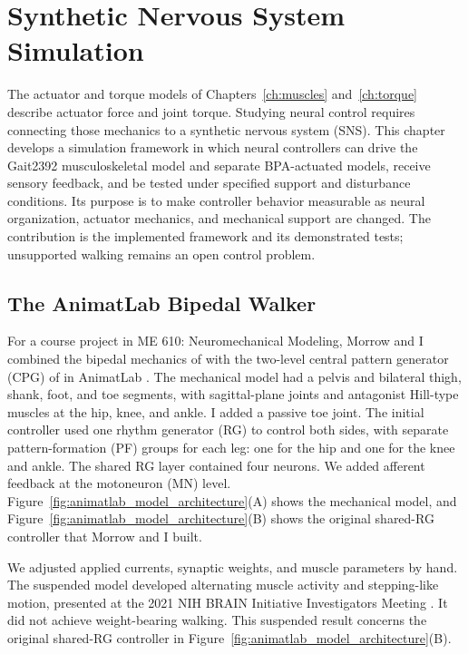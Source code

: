 \chapter{Synthetic Nervous System Simulation}\label{ch:sns}
\graphicspath{{figs/60-sns/}{figs/60-sns/AnimatLab_reference/}}

The actuator and torque models of Chapters~\ref{ch:muscles} and~\ref{ch:torque} describe actuator force and joint torque. Studying neural control requires connecting those mechanics to a synthetic nervous system (SNS). This chapter develops a simulation framework in which neural controllers can drive the Gait2392 musculoskeletal model and separate BPA-actuated models, receive sensory feedback, and be tested under specified support and disturbance conditions. Its purpose is to make controller behavior measurable as neural organization, actuator mechanics, and mechanical support are changed. The contribution is the implemented framework and its demonstrated tests; unsupported walking remains an open control problem.

\section{The AnimatLab Bipedal Walker}\label{sec:prior_walker}

For a course project in ME 610: Neuromechanical Modeling, Morrow and I combined the bipedal mechanics of \citet{li_bipedal_2017} with the two-level central pattern generator (CPG) of \citet{deng_neuromechanical_2019} in AnimatLab \citep{cofer_animatlab_2010}. The mechanical model had a pelvis and bilateral thigh, shank, foot, and toe segments, with sagittal-plane joints and antagonist Hill-type muscles at the hip, knee, and ankle. I added a passive toe joint. The initial controller used one rhythm generator (RG) to control both sides, with separate pattern-formation (PF) groups for each leg: one for the hip and one for the knee and ankle. The shared RG layer contained four neurons. We added afferent feedback at the motoneuron (MN) level. Figure~\ref{fig:animatlab_model_architecture}(A) shows the mechanical model, and Figure~\ref{fig:animatlab_model_architecture}(B) shows the original shared-RG controller that Morrow and I built.

We adjusted applied currents, synaptic weights, and muscle parameters by hand. The suspended model developed alternating muscle activity and stepping-like motion, presented at the 2021 NIH BRAIN Initiative Investigators Meeting \citep{bolenTorqueValuesArtificialKnee2021June15-17}. It did not achieve weight-bearing walking. This suspended result concerns the original shared-RG controller in Figure~\ref{fig:animatlab_model_architecture}(B).

